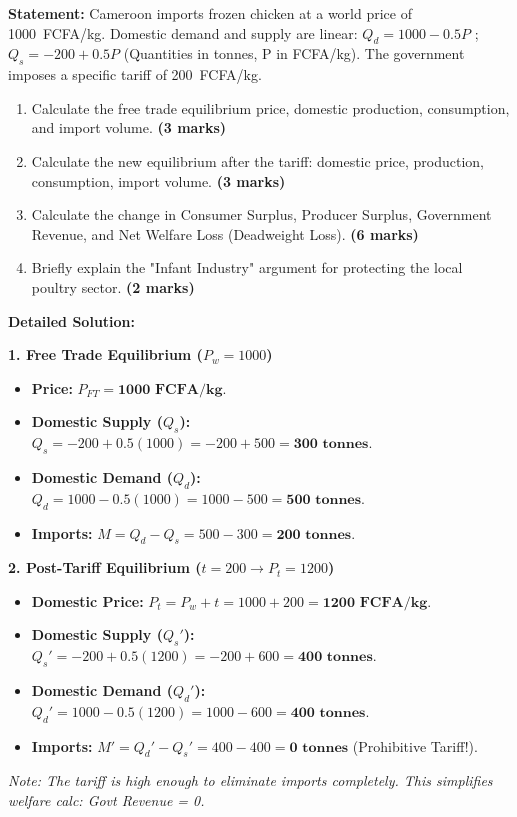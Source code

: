 \documentclass[11pt]{article}
\begin{document}
\begin{exoresolu}
\textbf{Statement:} Cameroon imports frozen chicken at a world price of \SI{1000}{FCFA/kg}. Domestic demand and supply are linear:
$Q_d = 1000 - 0.5P$ ; $Q_s = -200 + 0.5P$ (Quantities in tonnes, P in FCFA/kg).
The government imposes a specific tariff of \SI{200}{FCFA/kg}.
\begin{enumerate}
    \item Calculate the free trade equilibrium price, domestic production, consumption, and import volume. \textbf{(3 marks)}
    \item Calculate the new equilibrium after the tariff: domestic price, production, consumption, import volume. \textbf{(3 marks)}
    \item Calculate the change in Consumer Surplus, Producer Surplus, Government Revenue, and Net Welfare Loss (Deadweight Loss). \textbf{(6 marks)}
    \item Briefly explain the "Infant Industry" argument for protecting the local poultry sector. \textbf{(2 marks)}
\end{enumerate}

\tcblower
\textbf{Detailed Solution:}

\textbf{1. Free Trade Equilibrium ($P_w = 1000$)}
\begin{itemize}
    \item \textbf{Price:} $P_{FT} = \mathbf{1000 \text{ FCFA/kg}}$.
    \item \textbf{Domestic Supply ($Q_s$):} $Q_s = -200 + 0.5(1000) = -200 + 500 = \mathbf{300 \text{ tonnes}}$.
    \item \textbf{Domestic Demand ($Q_d$):} $Q_d = 1000 - 0.5(1000) = 1000 - 500 = \mathbf{500 \text{ tonnes}}$.
    \item \textbf{Imports:} $M = Q_d - Q_s = 500 - 300 = \mathbf{200 \text{ tonnes}}$.
\end{itemize}

\textbf{2. Post-Tariff Equilibrium ($t = 200 \rightarrow P_t = 1200$)}
\begin{itemize}
    \item \textbf{Domestic Price:} $P_t = P_w + t = 1000 + 200 = \mathbf{1200 \text{ FCFA/kg}}$.
    \item \textbf{Domestic Supply ($Q_s'$):} $Q_s' = -200 + 0.5(1200) = -200 + 600 = \mathbf{400 \text{ tonnes}}$.
    \item \textbf{Domestic Demand ($Q_d'$):} $Q_d' = 1000 - 0.5(1200) = 1000 - 600 = \mathbf{400 \text{ tonnes}}$.
    \item \textbf{Imports:} $M' = Q_d' - Q_s' = 400 - 400 = \mathbf{0 \text{ tonnes}}$ (Prohibitive Tariff!).
\end{itemize}
\textit{Note: The tariff is high enough to eliminate imports completely. This simplifies welfare calc: Govt Revenue = 0.}


\end{exoresolu}
\end{document}
